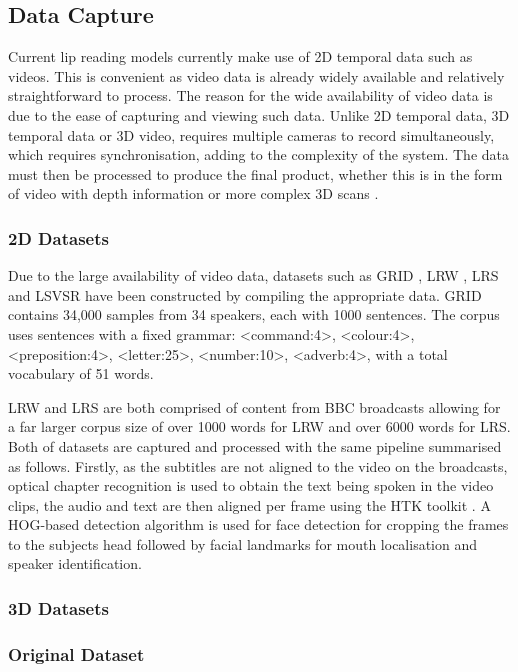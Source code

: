 \documentclass[12pt]{article}
\begin{document}
\subsection{Data Capture}
Current lip reading models currently make use of 2D temporal data such as videos.
This is convenient as video data is already widely available and relatively straightforward to process.
The reason for the wide availability of video data is due to the ease of capturing and viewing such data.
Unlike 2D temporal data, 3D temporal data or 3D video, requires multiple cameras to record simultaneously, which requires synchronisation, adding to the complexity of the system.
The data must then be processed to produce the final product, whether this is in the form of video with depth information or more complex 3D scans \cite{Li2017}.

\subsubsection{2D Datasets}
Due to the large availability of video data, datasets such as GRID \cite{Cooke2006}, LRW \cite{Chung2016}, LRS \cite{Chung2017} and LSVSR \cite{Shillingford2018} have been constructed by compiling the appropriate data.
GRID contains 34,000 samples from 34 speakers, each with 1000 sentences.
The corpus uses sentences with a fixed grammar: 
<command:4>, <colour:4>, <preposition:4>, <letter:25>, <number:10>, <adverb:4>, with a total vocabulary of 51 words.

LRW and LRS are both comprised of content from BBC broadcasts \cite{Chung2016, Chung2017} allowing for a far larger corpus size of over 1000 words for LRW and over 6000 words for LRS.
Both of datasets are captured and processed with the same pipeline summarised as follows. 
Firstly, as the subtitles are not aligned to the video on the broadcasts, optical chapter recognition is used to obtain the text being spoken in the video clips, the audio and text are then aligned per frame using the HTK toolkit \cite{Woodland1995}. 
A HOG-based detection algorithm \cite{King2009} is used for face detection for cropping the frames to the subjects head followed by facial landmarks for mouth localisation and speaker identification. 
\subsubsection{3D Datasets}

\subsubsection{Original Dataset}
\end{document}
